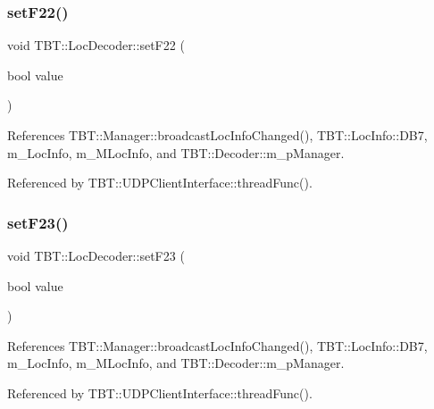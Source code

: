 \subsubsection{\texorpdfstring{set\+F22()}{setF22()}}
{\footnotesize\ttfamily void T\+B\+T\+::\+Loc\+Decoder\+::set\+F22 (\begin{DoxyParamCaption}\item[{bool}]{value }\end{DoxyParamCaption})\hspace{0.3cm}{\ttfamily [inline]}}



References T\+B\+T\+::\+Manager\+::broadcast\+Loc\+Info\+Changed(), T\+B\+T\+::\+Loc\+Info\+::\+D\+B7, m\+\_\+\+Loc\+Info, m\+\_\+\+M\+Loc\+Info, and T\+B\+T\+::\+Decoder\+::m\+\_\+p\+Manager.



Referenced by T\+B\+T\+::\+U\+D\+P\+Client\+Interface\+::thread\+Func().

\mbox{\label{classTBT_1_1LocDecoder_a7b5a668ba542b1d8a8b47064be1f5c5a_a7b5a668ba542b1d8a8b47064be1f5c5a}} 
\subsubsection{\texorpdfstring{set\+F23()}{setF23()}}
{\footnotesize\ttfamily void T\+B\+T\+::\+Loc\+Decoder\+::set\+F23 (\begin{DoxyParamCaption}\item[{bool}]{value }\end{DoxyParamCaption})\hspace{0.3cm}{\ttfamily [inline]}}



References T\+B\+T\+::\+Manager\+::broadcast\+Loc\+Info\+Changed(), T\+B\+T\+::\+Loc\+Info\+::\+D\+B7, m\+\_\+\+Loc\+Info, m\+\_\+\+M\+Loc\+Info, and T\+B\+T\+::\+Decoder\+::m\+\_\+p\+Manager.



Referenced by T\+B\+T\+::\+U\+D\+P\+Client\+Interface\+::thread\+Func().

\mbox{\label{classTBT_1_1LocDecoder_a3c44b57443b1d600380ccf8e55da23e5_a3c44b57443b1d600380ccf8e55da23e5}} 
